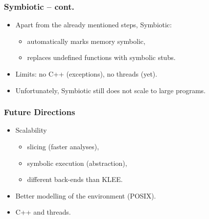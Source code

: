 \documentclass[sans]{beamer}
\begin{document}
\begin{frame}
\frametitle{Symbiotic -- cont.}
\begin{itemize}
  \item Apart from the already mentioned steps, Symbiotic:
  \begin{itemize}
    \item automatically marks memory symbolic,
    \item replaces undefined functions with symbolic stubs.
  \end{itemize}
  \item Limits: no C++ (exceptions), no threads (yet).
  \item Unfortunately, Symbiotic still does not scale to large programs.
\end{itemize}
\end{frame}

\begin{frame}
\frametitle{Future Directions}
\begin{itemize}
  \item Scalability
  \begin{itemize}
    \item slicing (faster analyses),
    \item symbolic execution (abstraction),
    \item different back-ends than KLEE.
  \end{itemize}
  \item Better modelling of the environment (POSIX).
  \item C++ and threads.
\end{itemize}
\end{frame}
\end{document}
